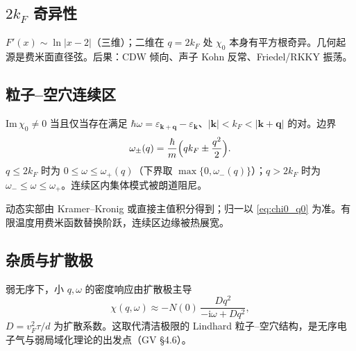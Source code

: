\subsection{\texorpdfstring{$2k_F$}{2kF} 奇异性}

$F'(x)\sim\ln|x-2|$（三维）；二维在 $q=2k_F$ 处 $\chi_0$ 本身有平方根奇异。几何起源是费米面直径弦。后果：CDW 倾向、声子 Kohn 反常、Friedel/RKKY 振荡。

\subsection{粒子--空穴连续区}

$\mathrm{Im}\,\chi_0\neq0$ 当且仅当存在满足
$\hbar\omega=\varepsilon_{\mathbf{k}+\mathbf{q}}-\varepsilon_{\mathbf{k}}$、$|\mathbf{k}|<k_F<|\mathbf{k}+\mathbf{q}|$
的对。边界
\begin{equation}
  \omega_{\pm}(q)
  =\frac{\hbar}{m}\Bigl(qk_F\pm\frac{q^2}{2}\Bigr).
\end{equation}
$q\le2k_F$ 时为 $0\le\omega\le\omega_+(q)$（下界取 $\max\{0,\omega_-(q)\}$）；$q>2k_F$ 时为 $\omega_-\le\omega\le\omega_+$。连续区内集体模式被朗道阻尼。

动态实部由 Kramer--Kronig 或直接主值积分得到；归一以 \eqref{eq:chi0_q0} 为准。有限温度用费米函数替换阶跃，连续区边缘被热展宽。

\subsection{杂质与扩散极}

弱无序下，小 $q,\omega$ 的密度响应由扩散极主导
\begin{equation}
  \chi(q,\omega)
  \approx
  -N(0)\,
  \frac{D q^2}{-\mathrm{i}\omega+D q^2},
\end{equation}
$D=v_F^2\tau/d$ 为扩散系数。这取代清洁极限的 Lindhard 粒子--空穴结构，是无序电子气与弱局域化理论的出发点（GV §4.6）。
